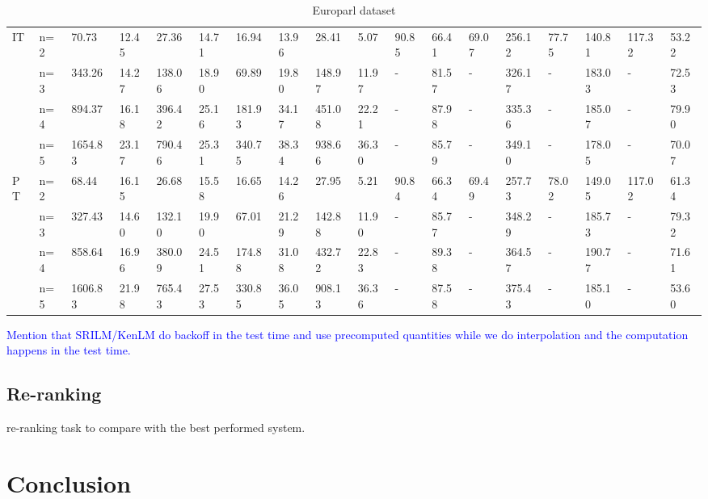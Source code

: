 \documentclass[11pt]{article}
\newcommand{\TODO}[1]{\textcolor{blue}{#1}}
\begin{document}
\begin{table*}
{\begin{tabular}{llllllll|ll|llllllll}
 \multirow{3}{*}{IT}
 & n=2 &70.73& 12.45&27.36 & 14.71&16.94 &13.96 & 28.41&5.07 &90.85&66.41&69.07&256.12&77.75&140.81&117.32&53.22\\
 & n=3 &343.26& 14.27& 138.06&18.90 & 69.89& 19.80& 148.97& 11.97&-&81.57&-&326.17&-&183.03&-&72.53\\
 & n=4 &894.37&16.18 &396.42 & 25.16&181.93 & 34.17& 451.08&22.21 &-&87.98&-&335.36&-&185.07&-&79.90\\
 & n=5 &1654.83&23.17 &790.46 &  25.31 & 340.75& 38.34& 938.66&36.30 &-&85.79&-&349.10&-&178.05&-&70.07\\\hline
 
 \multirow{3}{*}{PT}
 & n=2 &68.44&16.15 & 26.68& 15.58&16.65 & 14.26& 27.95&5.21 &90.84&66.34&69.49&257.73&78.02&149.05&117.02&61.34\\
 & n=3 &327.43&14.60 &132.10 & 19.90& 67.01&21.29 & 142.88&11.90 &-&85.77&-&348.29&-&185.73&-&79.32\\
 & n=4 &858.64&16.96 &380.09 & 24.51 &174.88 & 31.08& 432.72&22.83 &-&89.38&-&364.57&-&190.77&-&71.61\\
 & n=5 &1606.83& 21.98& 765.43&27.53 &330.85 & 36.05& 908.13&36.36 &-&87.58&-&375.43&-&185.10&-&53.60\\

    \bottomrule
\end{tabular}}
\caption{Europarl dataset}
\end{table*}
\TODO{Mention that SRILM/KenLM do backoff in the test time and use precomputed quantities while we do interpolation and the computation happens in the test time.}

\subsection{Re-ranking}
re-ranking task to compare with the best performed system.

\section{Conclusion}


\end{document}
